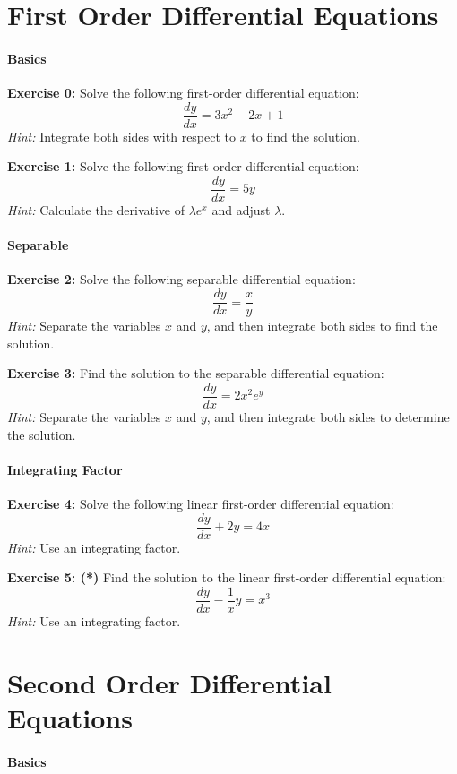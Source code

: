 \documentclass[]{article}
\begin{document}
	
	\section{First Order Differential Equations}
	\paragraph{Basics}\mbox{}
	
	\textbf{Exercise 0:}
	Solve the following first-order differential equation:
	\[
	\frac{dy}{dx} = 3x^2 - 2x + 1
	\]
	\textit{Hint:} Integrate both sides with respect to \(x\) to find the solution.
	
	\textbf{Exercise 1:}
	Solve the following first-order differential equation:
	\[
	\frac{dy}{dx} = 5y
	\]
	\textit{Hint:} Calculate the derivative of $\lambda e^x$ and adjust $\lambda$.
	
	\paragraph{Separable}\mbox{}
	
	\textbf{Exercise 2:}
	Solve the following separable differential equation:
	\[
	\frac{dy}{dx} = \frac{x}{y}
	\]
	\textit{Hint:} Separate the variables \(x\) and \(y\), and then integrate both sides to find the solution.
	
	\textbf{Exercise 3:}
	Find the solution to the separable differential equation:
	\[
	\frac{dy}{dx} = 2x^2 e^y
	\]
	\textit{Hint:} Separate the variables \(x\) and \(y\), and then integrate both sides to determine the solution.
	
	\paragraph{Integrating Factor}\mbox{}
	
	\textbf{Exercise 4:}
	Solve the following linear first-order differential equation:
	\[
	\frac{dy}{dx} + 2y = 4x
	\]
	\textit{Hint:} Use an integrating factor.
	
	\textbf{Exercise 5: (*)}
	Find the solution to the linear first-order differential equation:
	\[
	\frac{dy}{dx} - \frac{1}{x}y = x^3
	\]
	\textit{Hint:} Use an integrating factor.
	
	
	
	\section{Second Order Differential Equations}
	\paragraph{Basics}\mbox{}
	
\end{document}
